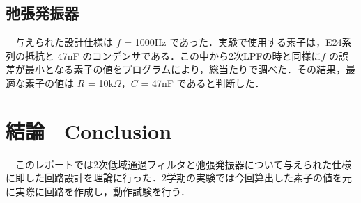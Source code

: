 \subsection{弛張発振器}
　与えられた設計仕様は $f$ = 1000Hz であった．実験で使用する素子は，E24系列の抵抗と 47nF のコンデンサである．この中から2次LPFの時と同様に$f$ の誤差が最小となる素子の値をプログラムにより，総当たりで調べた．その結果，最適な素子の値は $R$ = 10k$\Omega$，$C$ = 47nF であると判断した．




\section{結論　Conclusion}
　このレポートでは2次低域通過フィルタと弛張発振器について与えられた仕様に即した回路設計を理論に行った．2学期の実験では今回算出した素子の値を元に実際に回路を作成し，動作試験を行う．






